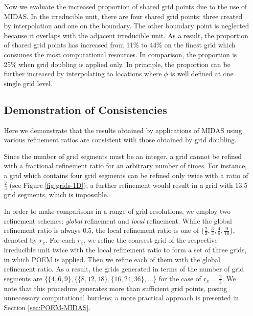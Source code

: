 Now we evaluate the increased proportion of shared grid points due to the use of MIDAS. In the irreducible unit, there are four shared grid points: three created by interpolation and one on the boundary. The other boundary point is neglected because it overlaps with the adjacent irreducible unit. As a result, the proportion of shared grid points has increased from 11\% to 44\% on the finest grid which consumes the most computational resources. In comparison, the proportion is 25\% when grid doubling is applied only. In principle, the proportion can be further increased by interpolating to locations where $\phi$ is well defined at one single grid level.


\subsection{Demonstration of Consistencies} \label{subsec:consistencies}
Here we demonstrate that the results obtained by applications of MIDAS using various refinement ratios are consistent with those obtained by grid doubling.

Since the number of grid segments must be an integer, a grid cannot be refined with a fractional refinement ratio for an arbitrary number of times. For instance, a grid which contains four grid segments can be refined only twice with a ratio of $\frac{2}{3}$ (see Figure \ref{fig:grids-1D}); a further refinement would result in a grid with 13.5 grid segments, which is impossible.

In order to make comparisons in a range of grid resolutions, we employ two refinement schemes: \textit{global} refinement and \textit{local} refinement. While the global refinement ratio is always 0.5, the local refinement ratio is one of $\{\frac{2}{3}, \frac{3}{4}, \frac{4}{5}, \frac{9}{10}\}$, denoted by $r_x$. For each $r_x$, we refine the coarsest grid of the respective irreducible unit twice with the local refinement ratio to form a set of three grids, in which POEM is applied. Then we refine each of them with the global refinement ratio. As a result, the grids generated in terms of the number of grid segments are $\{\{4,6,9\}, \{\{8,12,18\}, \{16,24,36\}, \dots \}$ for the case of $r_x = \frac{2}{3}$. We note that this procedure generates more than sufficient grid points, posing unnecessary computational burdens; a more practical approach is presented in Section \ref{sec:POEM-MIDAS}.


